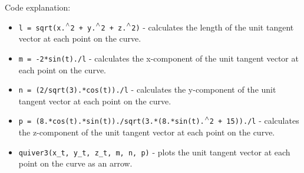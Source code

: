 Code explanation:
\begin{itemize}
    \item \texttt{\color{mygreen}l = sqrt(x.$\caret$2 + y.$\caret$2 + z.$\caret$2)} - calculates the length of the unit tangent vector at each point on the curve.
    \item \texttt{\color{mygreen}m = -2*sin(t)./l} - calculates the x-component of the unit tangent vector at each point on the curve.
    \item \texttt{\color{mygreen}n = (2/sqrt(3).*cos(t))./l} - calculates the y-component of the unit tangent vector at each point on the curve.
    \item \texttt{\color{mygreen}p = (8.*cos(t).*sin(t))./sqrt(3.*(8.*sin(t).$\caret$2 + 15))./l} - calculates the z-component of the unit tangent vector at each point on the curve.
    \item \texttt{\color{mygreen}quiver3(x\_t, y\_t, z\_t, m, n, p)} - plots the unit tangent vector at each point on the curve as an arrow.
  \end{itemize}
